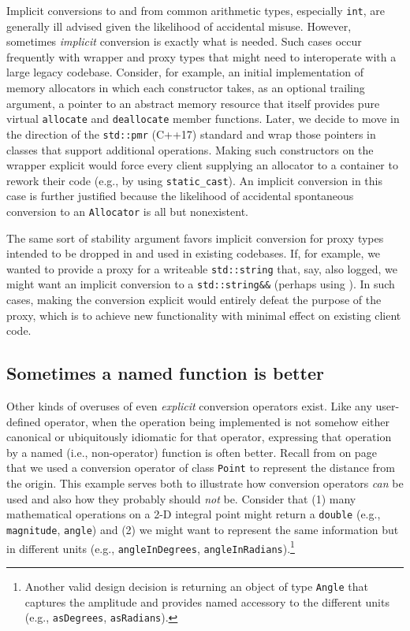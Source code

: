 Implicit conversions to and from common arithmetic types, especially
\texttt{int}, are generally ill advised given the likelihood of
accidental misuse. However, sometimes \emph{implicit}
conversion is exactly what is needed. Such cases occur frequently with
wrapper and proxy types that might need to interoperate with a large
legacy codebase. Consider, for example, an initial implementation of
memory allocators in which each constructor takes, as an optional
trailing argument, a pointer to an abstract memory resource that itself
provides pure virtual \texttt{allocate} and \texttt{deallocate} member
functions. Later, we decide to move in the direction of the
\texttt{std::pmr} (C++17) standard and wrap those pointers in classes
that support additional operations. Making such constructors on the
wrapper explicit would force every client supplying an allocator to a
container to rework their code (e.g., by using \texttt{static\_cast}).
An implicit conversion in this case is further justified because the
likelihood of accidental spontaneous conversion to an \texttt{Allocator}
is all but nonexistent.

The same sort of stability argument favors implicit conversion for proxy
types intended to be dropped in and used in existing codebases. If, for
example, we wanted to provide a proxy for a writeable
\texttt{std::string} that, say, also logged, we might want an implicit
conversion to a \texttt{std::string\&\&} (perhaps using
). In such cases, making the
conversion explicit would entirely defeat the purpose of the proxy,
which is to achieve new functionality with minimal effect on existing
client code.

\subsection[Sometimes a named function is better]{Sometimes a named function is better}\label{sometimes-a-named-function-is-better}

Other kinds of overuses of even \emph{explicit} conversion
operators exist. Like any user-defined operator, when the operation being
implemented is not somehow either canonical or ubiquitously idiomatic
for that operator, expressing that operation by a
named (i.e., non-operator) function is often better. Recall from
{\it{}} on page~\pageref{description-explicitconv} that we used a conversion operator of
class \texttt{Point} to represent the distance from the origin. This
example serves both to illustrate how conversion operators \emph{can} be
used and also how they probably should \emph{not} be. Consider that (1)
many mathematical operations on a 2-D integral point might return a \texttt{double} (e.g., \texttt{magnitude},
\texttt{angle}) and (2) we might want to represent the same
information but in different units (e.g., \texttt{angleInDegrees},
\texttt{angleInRadians}).{\cprotect\footnote{Another valid design
decision is returning an object of type \texttt{Angle} that captures
the amplitude and provides named accessory to the different units
  (e.g., \texttt{asDegrees}, \texttt{asRadians}).}}

